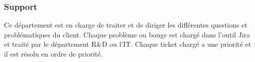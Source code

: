 \subsubsection{Support}
Ce département est en charge de traiter et de diriger les différentes questions et problématiques du client.
Chaque problème ou bouge est chargé dans l'outil Jira et traité par le département R\&D ou l'IT.
Chaque ticket chargé a une priorité et il est résolu en ordre de priorité.
